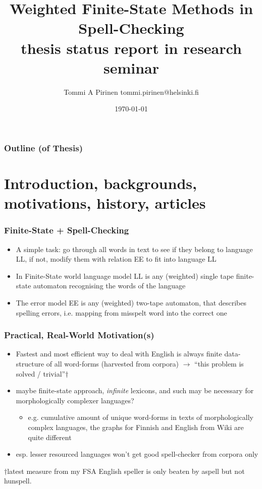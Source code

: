 \documentclass[t,12pt]{beamer}
\title{Weighted Finite-State Methods in Spell-Checking\\
\scriptsize{thesis status report in
research seminar}}
\author{Tommi A Pirinen \scriptsize \guilsinglleft{}tommi.pirinen@helsinki.fi\guilsinglright{}}
\institute{University of Helsinki\\Department of Modern Languages}
\date{\today}
\begin{document}

\HyTitle

\begin{frame}
    \frametitle{Outline (of Thesis)}
    \tableofcontents
\end{frame}

\section{Introduction, backgrounds, motivations, history, articles}

\begin{frame}
    \frametitle{Finite-State + Spell-Checking}
    \begin{itemize}
        \item A simple task: go through all words in text to see if they
            belong to language LL, if not, modify them with relation
            EE to fit into language LL
        \item In Finite-State world language model LL is any (weighted) single
            tape finite-state automaton recognising the words of the
            language
        \item The error model EE is any (weighted) two-tape automaton, that
            describes spelling errors, i.e. mapping from misspelt word into
            the correct one
    \end{itemize}
\end{frame}

\begin{frame}
    \frametitle{Practical, Real-World Motivation(s)}
    \begin{itemize}
        \item Fastest and most efficient way to deal with English is always
            finite data-structure of all word-forms (harvested from corpora)
            $\rightarrow$ ``this problem is solved / trivial''$\dagger$
        \item maybe finite-state approach, \emph{infinite} lexicons,
            and such may be necessary for morphologically complexer languages?
            \begin{itemize}
            \item e.g. cumulative amount of unique word-forms in texts of
            morphologically complex languages, the graphs for Finnish and
            English from Wiki are quite different
            \end{itemize}
        \item esp. lesser resourced languages won't get good spell-checker from
            corpora only
    \end{itemize}
    \begin{tiny}$\dagger$latest measure from my FSA English speller is only
    beaten by aspell but not hunspell.\end{tiny}
\end{frame}
\end{document}
